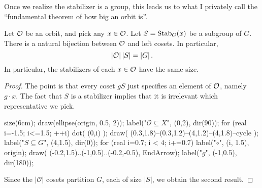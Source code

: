 Once we realize the stabilizer is a group, this leads us to what I privately call the ``fundamental theorem of how big an orbit is''.
\begin{theorem}
	Let $\mathcal O$ be an orbit, and pick any $x \in \mathcal O$.
	Let $S = \operatorname{Stab}_G(x)$ be a subgroup of $G$.
	There is a natural bijection between $\mathcal O$ and left cosets.
	In particular,
	\[ \left\lvert \mathcal O \right\rvert \left\lvert S \right\rvert = \left\lvert G \right\rvert. \]
	In particular, the stabilizers of each $x \in \mathcal O$ have the same size.
\end{theorem}
\begin{proof}
	The point is that every coset $gS$ just specifies an element of $\mathcal O$,
	namely $g \cdot x$. The fact that $S$ is a stabilizer implies
	that it is irrelevant which representative we pick.

	\begin{center}
		\begin{asy}
			size(6cm);
			draw(ellipse(origin, 0.5, 2));
			label("$\mathcal O \subseteq X$", (0,2), dir(90));
			for (real i=-1.5; i<=1.5; ++i) {
				dot( (0,i) );
			}
			draw( (0.3,1.8)--(0.3,1.2)--(4,1.2)--(4,1.8)--cycle );
			label("$S \subseteq G$", (4,1.5), dir(0));
			for (real i=0.7; i < 4; i+=0.7) {
				label("$\circ$", (i, 1.5), origin);
			}
			draw( (-0.2,1.5)..(-1,0.5)..(-0.2,-0.5), EndArrow);
			label("$g$", (-1,0.5), dir(180));
		\end{asy}
	\end{center}

	Since the $\left\lvert \mathcal O \right\rvert$ cosets partition $G$,
	each of size $\left\lvert S \right\rvert$, we obtain the second result.
\end{proof}

